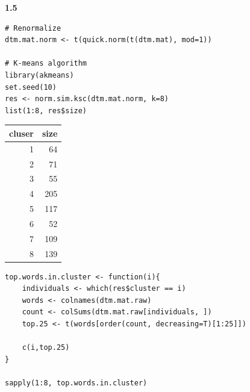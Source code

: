 \documentclass[11pt]{article}
\begin{document}
\textbf{1.5}


\begin{verbatim}
# Renormalize
dtm.mat.norm <- t(quick.norm(t(dtm.mat), mod=1))

# K-means algorithm
library(akmeans)
set.seed(10)
res <- norm.sim.ksc(dtm.mat.norm, k=8)
list(1:8, res$size)
\end{verbatim}

\begin{org}
\begin{center}
\begin{tabular}{rr}
cluser & size\\
\hline
1 & 64\\
2 & 71\\
3 & 55\\
4 & 205\\
5 & 117\\
6 & 52\\
7 & 109\\
8 & 139\\
\end{tabular}
\end{center}
\end{org}



\begin{verbatim}
top.words.in.cluster <- function(i){
    individuals <- which(res$cluster == i)
    words <- colnames(dtm.mat.raw)
    count <- colSums(dtm.mat.raw[individuals, ])
    top.25 <- t(words[order(count, decreasing=T)[1:25]])

    c(i,top.25)
}

sapply(1:8, top.words.in.cluster)
\end{verbatim}
\end{document}
